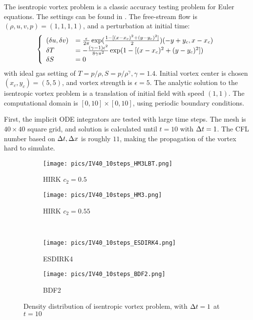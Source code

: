\documentclass[preprint,12pt]{elsarticle}
\begin{document}
The isentropic vortex problem is a classic
accuracy testing problem for Euler equations.
The settings can be found in \cite{hu1999weighted_WENO}.
The free-stream flow is $(\rho,u,v,p)=(1,1,1,1)$,
and a perturbation at initial time:
\begin{equation}
    \left\{
    \begin{array}[2]{ll}
        (\delta u, \delta v) & = \frac{\epsilon}{2\pi}\exp(\frac{1-[(x-x_c)^2+(y-y_c)^2]}{2})(-y+y_c,x-x_c) \\
        \delta T             & = - \frac{(\gamma-1)\epsilon^2}{8\gamma\pi^2}\exp(1-[(x-x_c)^2+(y-y_c)^2])   \\
        \delta S             & = 0                                                                          \\
    \end{array}
    \right.
\end{equation}
with ideal gas setting of $T = p/\rho, S= p/\rho^\gamma, \gamma =1.4$.
Initial vortex center is chosen $(x_c,y_c)=(5,5)$, 
and vortex strength is $\epsilon = 5$.
The analytic solution to the isentropic vortex problem is a
translation of initial field with speed $(1,1)$.
The computational domain is $[0,10]\times[0,10]$,
using periodic boundary conditions.

First, the implicit ODE integrators are tested with large
time steps.
The mesh is $40\times40$ square grid,
and solution is calculated until $t=10$ with $\mathrm\Delta t=1$.
The CFL number based on $\mathrm\Delta t, \mathrm\Delta x$ is roughly $11$,
making the propagation of the vortex hard to
simulate.

\begin{figure}[htbp]
    \centering
    \begin{subfigure}{0.5\textwidth}
        \texttt{[image: pics/IV40\_10steps\_HM3LBT.png]}
        \caption[]{HIRK $c_2=0.5$}
        \label{sfig:IV10Step_HM3LBT}
    \end{subfigure}\hfill
    \begin{subfigure}{0.5\textwidth}
        \texttt{[image: pics/IV40\_10steps\_HM3.png]}
        \caption[]{HIRK $c_2=0.55$}
        \label{sfig:IV10Step_HM3}
    \end{subfigure}\\
    \begin{subfigure}{0.5\textwidth}
        \texttt{[image: pics/IV40\_10steps\_ESDIRK4.png]}
        \caption[]{ESDIRK4}
        \label{sfig:IV10Step_ESDIRK4}
    \end{subfigure}\hfill
    \begin{subfigure}{0.5\textwidth}
        \texttt{[image: pics/IV40\_10steps\_BDF2.png]}
        \caption[]{BDF2}
        \label{sfig:IV10Step_BDF2}
    \end{subfigure}
    \caption{Density distribution of isentropic vortex problem, with $\mathrm\Delta t = 1$ at $t=10$}
    \label{fig:IV10Step}
\end{figure}
\end{document}
